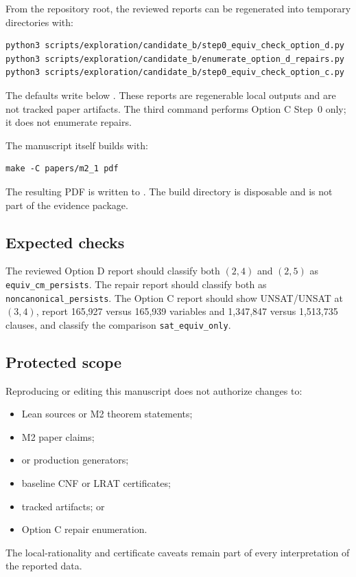 From the repository root, the reviewed reports can be regenerated into
temporary directories with:
\begin{verbatim}
python3 scripts/exploration/candidate_b/step0_equiv_check_option_d.py
python3 scripts/exploration/candidate_b/enumerate_option_d_repairs.py
python3 scripts/exploration/candidate_b/step0_equiv_check_option_c.py
\end{verbatim}
The defaults write below .  These reports are regenerable local
outputs and are not tracked paper artifacts.  The third command performs Option
C Step~0 only; it does not enumerate repairs.

The manuscript itself builds with:
\begin{verbatim}
make -C papers/m2_1 pdf
\end{verbatim}
The resulting PDF is written to
.  The build directory is disposable and is
not part of the evidence package.

\subsection{Expected checks}

The reviewed Option D report should classify both $(2,4)$ and $(2,5)$ as
\texttt{equiv\_cm\_persists}.  The repair report should classify both as
\texttt{noncanonical\_persists}.  The Option C report should show
UNSAT/UNSAT at $(3,4)$, report 165,927 versus 165,939 variables and 1,347,847
versus 1,513,735 clauses, and classify the comparison
\texttt{sat\_equiv\_only}.

\subsection{Protected scope}

Reproducing or editing this manuscript does not authorize changes to:
\begin{itemize}
  \item Lean sources or M2 theorem statements;
  \item M2 paper claims;
  \item {} or production generators;
  \item baseline CNF or LRAT certificates;
  \item tracked  artifacts; or
  \item Option C repair enumeration.
\end{itemize}
The local-rationality and certificate caveats remain part of every
interpretation of the reported data.
